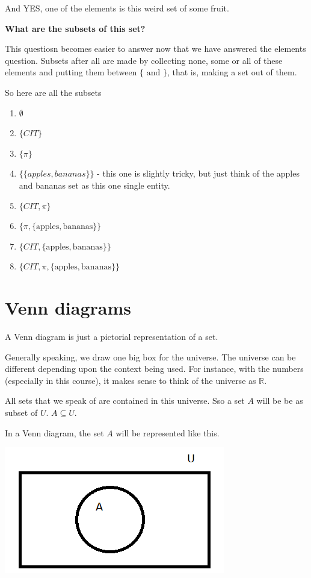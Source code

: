 \documentclass[12pt]{article}
\begin{document}
And YES, one of the elements is this weird set of some fruit.

\medskip

\textbf{What are the subsets of this set?}

This questiosn becomes easier to answer now that we have answered the elements question. Subsets after all are made by collecting none, some or all of these elements and putting them between $\{ \text{ and } \}$, that is, making a set out of them.

So here are all the subsets
\begin{enumerate}
\item $\emptyset$
\item $\{CIT\}$
\item $\{\pi\}$
\item $\{\{apples, bananas\}\}$ - this one is slightly tricky, but just think of the apples and bananas set as this one single entity.
\item $\{CIT, \pi\}$
\item $\{\pi, \{\text{apples}, \text{bananas} \} \}$
\item $\{CIT, \{\text{apples}, \text{bananas} \} \}$
\item $\{CIT, \pi , \{\text{apples}, \text{bananas} \} \}$
\end{enumerate}


\section*{Venn diagrams}

A Venn diagram is just a pictorial representation of a set.

Generally speaking, we draw one big box for the universe. The universe can be different depending upon the context being used. For instance, with the numbers (especially in this course), it makes sense to think of the universe as $\mathbb{R}$.

All sets that we speak of are contained in this universe. Sso a set $A$ will be 
be as subset of $U$. $ A \subseteq U$.

In a Venn diagram, the set $A$ will be represented like this.

\includegraphics{BasicVenn.png}
\end{document}
